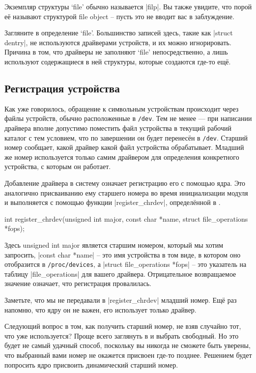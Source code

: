 \documentclass[10pt, oneside]{book}
\begin{document}
Экземпляр структуры `file' обычно называется \cpp|filp|.
Вы также увидите, что порой её называют структурой file object – пусть это не вводит вас в заблуждение.

Загляните в определение `file'. Большинство записей здесь, такие как \cpp|struct dentry|,
не используются драйверами устройств, и их можно игнорировать. Причина в том, что
драйверы не заполняют `file' непосредственно, а лишь используют содержащиеся в ней
структуры, которые создаются где-то ещё.

\subsection{Регистрация устройства}
\label{sec:register_device}
Как уже говорилось, обращение к символьным устройствам происходит через файлы устройств, обычно расположенные в \verb|/dev|.
Тем не менее — при написании драйвера вполне допустимо поместить файл устройства в текущий рабочий каталог с тем условием, что по завершении он будет перенесён в \verb|/dev|.
Старший номер сообщает, какой драйвер какой файл устройства обрабатывает.
Младший же номер используется только самим драйвером для определения конкретного устройства, с которым он работает.

Добавление драйвера в систему означает регистрацию его с помощью ядра. Это аналогично присваиванию ему старшего номера во время инициализации модуля и
выполняется с помощью функции \cpp|register_chrdev|, определённой в .

\begin{code}
int register_chrdev(unsigned int major, const char *name, struct file_operations *fops);
\end{code}

Здесь unsigned int major является старшим номером, который мы хотим запросить, \cpp|const char *name| – это имя устройства в том виде, в котором оно отобразится в \verb|/proc/devices|, а \cpp|struct file_operations *fops| – это указатель на таблицу \cpp|file_operations| для вашего драйвера.
Отрицательное возвращаемое значение означает, что регистрация провалилась.

Заметьте, что мы не передавали в \cpp|register_chrdev| младший номер. Ещё раз напомню,
что ядру он не важен, его использует только драйвер.

Следующий вопрос в том, как получить старший номер, не взяв случайно тот, что уже используется? Проще всего заглянуть в  и выбрать свободный. Но это будет не самый удачный способ, поскольку вы никогда не сможете быть уверены, что выбранный вами номер не окажется присвоен где-то позднее. Решением будет попросить ядро присвоить динамический старший номер.
\end{document}

